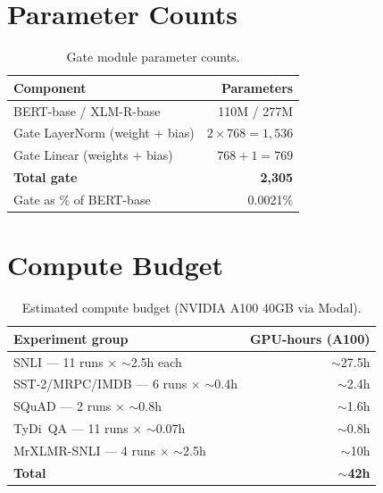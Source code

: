 \documentclass[11pt,a4paper]{article}
\begin{document}
\appendix

\section{Parameter Counts}
\label{app:params}

\begin{table}[h]
\centering
\begin{tabular}{@{}lr@{}}
\toprule
\textbf{Component} & \textbf{Parameters} \\
\midrule
BERT-base / XLM-R-base           & 110M / 277M \\
Gate LayerNorm (weight $+$ bias)  & $2 \times 768 = 1{,}536$ \\
Gate Linear (weights $+$ bias)    & $768 + 1 = 769$ \\
\textbf{Total gate}               & \textbf{2,305} \\
Gate as \% of BERT-base          & 0.0021\% \\
\bottomrule
\end{tabular}
\caption{Gate module parameter counts.}
\label{tab:params}
\end{table}


\section{Compute Budget}
\label{app:compute}

\begin{table}[h]
\centering
\begin{tabular}{@{}lr@{}}
\toprule
\textbf{Experiment group} & \textbf{GPU-hours (A100)} \\
\midrule
SNLI --- 11 runs $\times$ $\sim$2.5h each    & $\sim$27.5h \\
SST-2/MRPC/IMDB --- 6 runs $\times$ $\sim$0.4h & $\sim$2.4h \\
SQuAD --- 2 runs $\times$ $\sim$0.8h          & $\sim$1.6h \\
TyDi~QA --- 11 runs $\times$ $\sim$0.07h      & $\sim$0.8h \\
MrXLMR-SNLI --- 4 runs $\times$ $\sim$2.5h    & $\sim$10h \\
\midrule
\textbf{Total}                                  & $\sim$\textbf{42h} \\
\bottomrule
\end{tabular}
\caption{Estimated compute budget (NVIDIA A100 40GB via Modal).}
\label{tab:compute}
\end{table}
\end{document}
